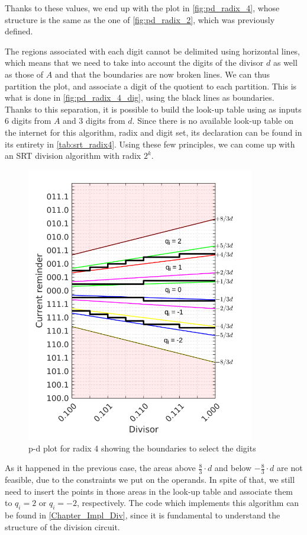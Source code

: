 Thanks to these values, we end up with the plot in \autoref{fig:pd_radix_4}, whose structure is the same as the one of \autoref{fig:pd_radix_2}, which was previously defined.  

The regions associated with each digit cannot be delimited using horizontal lines, which means that we need to take into account the digits of the divisor $d$ as well as those of $A$ and that the boundaries are now broken lines. 
We can thus partition the plot, and associate  a digit of the quotient to each partition. 
This is what is done in \autoref{fig:pd_radix_4_dig}, using the black lines as boundaries. 
Thanks to this separation, it is possible to build the look-up table using as inputs 6 digits from $A$ and 3 digits from $d$. 
Since there is no available look-up table on the internet for this algorithm, radix and digit set, its declaration can be found in its entirety in \autoref{tab:srt_radix4}.
Using these few principles, we can come up with an SRT division algorithm with radix $2^k$. 

\begin{figure}
    \centering
    \includegraphics[width=100mm]{images/pd_plot_r4_q.png}
    \caption{p-d plot for radix 4 showing the boundaries to select the digits}
    \label{fig:pd_radix_4_dig}
\end{figure}

As it happened in the previous case, the areas above $\frac{8}{3}\cdot d$ and below $-\frac{8}{3}\cdot d$ are not feasible, due to the constraints we put on the operands. In spite of that, we still need to insert the points in those areas in the look-up table and associate them to $q_i = 2$ or $q_i = -2$, respectively.
The code which implements this algorithm can be found in \autoref{Chapter_Impl_Div}, since it is fundamental to understand the structure of the division circuit. 

